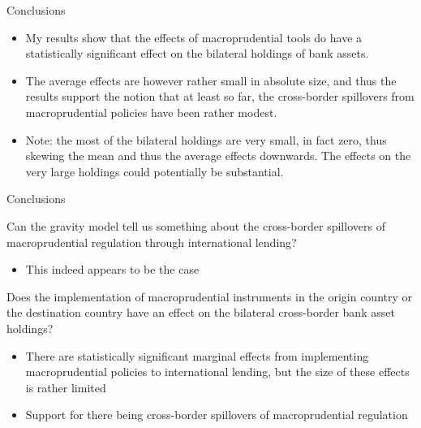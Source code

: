 \documentclass{beamer}
\begin{document}
\begin{frame}{Conclusions}
\begin{itemize}
    \item My results show that the effects of macroprudential tools do have a statistically significant effect on the bilateral holdings of bank assets.  
    \item The average effects are however rather small in absolute size, and thus the results support the notion that at least so far, the cross-border spillovers from macroprudential policies have been rather modest. 
    \item Note: the most of the bilateral holdings are very small, in fact zero, thus skewing the mean and thus the average effects downwards. The effects on the very large holdings could potentially be substantial.
\end{itemize}
\end{frame}


\begin{frame}{Conclusions}
\begin{block}{Can the gravity model tell us something about the cross-border spillovers of macroprudential regulation through international lending?}
\begin{itemize}
\item This indeed appears to be the case
\end{itemize}
\end{block}
\begin{block}{Does the implementation of macroprudential instruments in the origin country or the destination country have an effect on the bilateral cross-border bank asset holdings?}
\begin{itemize}
\item There are statistically significant marginal effects from implementing macroprudential policies to international lending, but the size of these effects is rather limited
\item Support for there being cross-border spillovers of macroprudential regulation
\end{itemize}
\end{block}
\end{frame}
\end{document}
